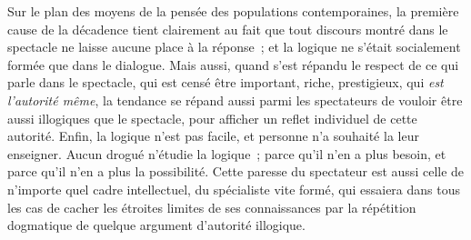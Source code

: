 \documentclass[french,twoside]{book} %
\def\mednobreak{\ifdim\lastskip<\medskipamount
  \removelastskip\nopagebreak\medskip\fi}
\newcommand{\labelblock}[1]{\medbreak{\noindent\color{rubric}\bfseries #1}\par\mednobreak}
\begin{document}
Sur le plan des moyens de la pensée des populations contemporaines, la première cause de la décadence tient clairement au fait que tout discours montré dans le spectacle ne laisse aucune place à la réponse ; et la logique ne s’était socialement formée que dans le dialogue. Mais aussi, quand s’est répandu le respect de ce qui parle dans le spectacle, qui est censé être important, riche, prestigieux, qui \emph{est l’autorité même}, la tendance se répand aussi parmi les spectateurs de vouloir être aussi illogiques que le spectacle, pour afficher un reflet individuel de cette autorité. Enfin, la logique n’est pas facile, et personne n’a souhaité la leur enseigner. Aucun drogué n’étudie la logique ; parce qu’il n’en a plus besoin, et parce qu’il n’en a plus la possibilité. Cette paresse du spectateur est aussi celle de n’importe quel cadre intellectuel, du spécialiste vite formé, qui essaiera dans tous les cas de cacher les étroites limites de ses connaissances par la répétition dogmatique de quelque argument d’autorité illogique.\par

\labelblock{XI}
\end{document}
